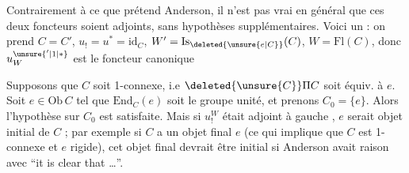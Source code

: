 
Contrairement à ce que prétend Anderson,
il n'est pas vrai en général que ces
deux foncteurs soient adjoints, sans hypothèses
supplémentaires. Voici un
 : on prend $C=C'$, $u_!=u^*=\mathrm{id}_C$,
$W'=\mathrm{Is}_{\deleted{\unsure{e|C}}}(C)$, $W=\mathrm{Fl}(C)$, donc  $u_W^{\unsure{'|1|*}}$ est
le foncteur canonique


Supposons que $C$ soit 1-connexe,  i.e
$\deleted{\unsure{C}}\Pi C$ soit équiv. à $e$. Soit $e\in\mathrm{Ob}\,C$
tel que  $\mathrm{End}_C(e)$ soit le groupe unité,
  et
prenons $C_0=\{e\}$. Alors l'hypothèse
sur $C_0$ est satisfaite. Mais si $u_!^W$
était adjoint à gauche , $e$ serait objet
initial de $C$ ; 
par exemple si $C$ a un objet final $e$
(ce qui implique que $C$ est 1-connexe et
$e$ rigide), cet objet final devrait
être initial si Anderson avait raison avec
``it is clear that \ldots''.
